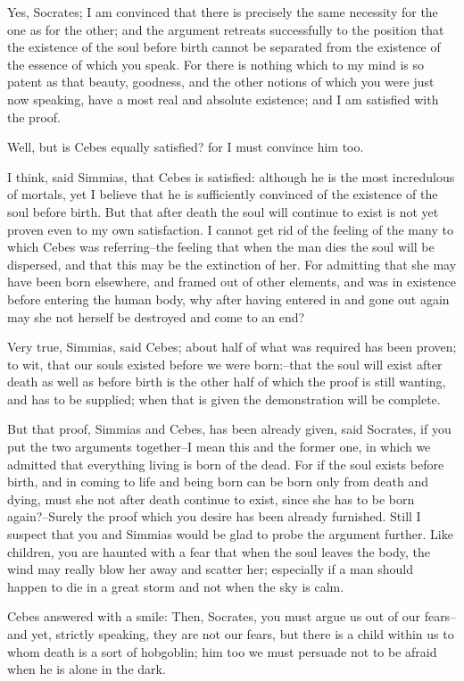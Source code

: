 Yes, Socrates; I am convinced that there is precisely the same necessity
for the one as for the other; and the argument retreats successfully
to the position that the existence of the soul before birth cannot be
separated from the existence of the essence of which you speak. For
there is nothing which to my mind is so patent as that beauty, goodness,
and the other notions of which you were just now speaking, have a most
real and absolute existence; and I am satisfied with the proof.

Well, but is Cebes equally satisfied? for I must convince him too.

I think, said Simmias, that Cebes is satisfied: although he is the most
incredulous of mortals, yet I believe that he is sufficiently convinced
of the existence of the soul before birth. But that after death the soul
will continue to exist is not yet proven even to my own satisfaction.
I cannot get rid of the feeling of the many to which Cebes was
referring--the feeling that when the man dies the soul will be
dispersed, and that this may be the extinction of her. For admitting
that she may have been born elsewhere, and framed out of other elements,
and was in existence before entering the human body, why after having
entered in and gone out again may she not herself be destroyed and come
to an end?

Very true, Simmias, said Cebes; about half of what was required has been
proven; to wit, that our souls existed before we were born:--that the
soul will exist after death as well as before birth is the other half of
which the proof is still wanting, and has to be supplied; when that is
given the demonstration will be complete.

But that proof, Simmias and Cebes, has been already given, said
Socrates, if you put the two arguments together--I mean this and the
former one, in which we admitted that everything living is born of the
dead. For if the soul exists before birth, and in coming to life and
being born can be born only from death and dying, must she not after
death continue to exist, since she has to be born again?--Surely the
proof which you desire has been already furnished. Still I suspect
that you and Simmias would be glad to probe the argument further. Like
children, you are haunted with a fear that when the soul leaves the
body, the wind may really blow her away and scatter her; especially if a
man should happen to die in a great storm and not when the sky is calm.

Cebes answered with a smile: Then, Socrates, you must argue us out of
our fears--and yet, strictly speaking, they are not our fears, but there
is a child within us to whom death is a sort of hobgoblin; him too we
must persuade not to be afraid when he is alone in the dark.

